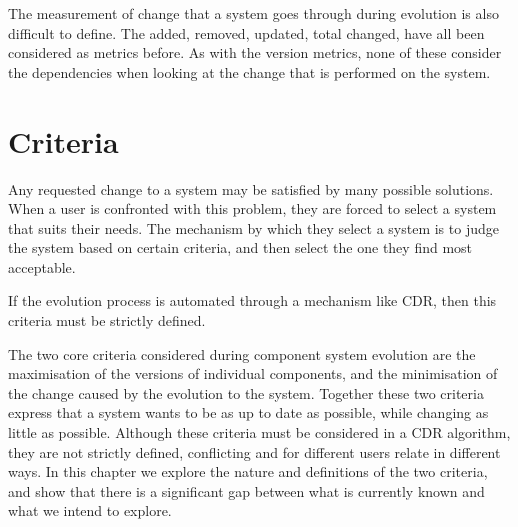 The measurement of change that a system goes through during evolution is also difficult to define.
The added, removed, updated, total changed, have all been considered as metrics before. 
As with the version metrics, none of these consider the dependencies when looking at the change that is performed on the system.






\section{Criteria}
Any requested change to a system may be satisfied by many possible solutions.
When a user is confronted with this problem, they are forced to select a system that suits their needs.
The mechanism by which they select a system is to judge the system based on certain criteria, and then select the one they find most acceptable.

If the evolution process is automated through a mechanism like CDR, then this criteria must be strictly defined.


The two core criteria considered during component system evolution are the maximisation of the versions of individual components, 
and the minimisation of the change caused by the evolution to the system.
Together these two criteria express that a system wants to be as up to date as possible, while changing as little as possible.
Although these criteria must be considered in a CDR algorithm,
they are not strictly defined, conflicting and for different users relate in different ways.
In this chapter we explore the nature and definitions of the two criteria,
and show that there is a significant gap between what is currently known and what we intend to explore. 

